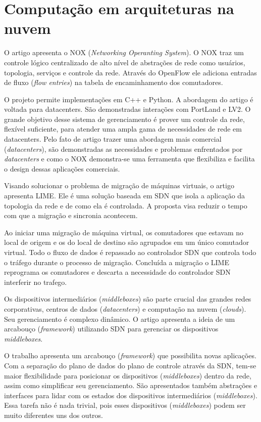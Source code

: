 \section{Computação em arquiteturas na nuvem}

O artigo \citep{arsalan2009applying} apresenta o NOX
(\emph{Networking Operanting System}).
O NOX traz um controle lógico centralizado de alto nível de abstrações de
rede como usuários, topologia, serviços e controle da rede.
Através do OpenFlow ele adiciona entradas de fluxo (\emph{flow entries}) na
tabela de encaminhamento dos comutadores.

O projeto permite implementações em C++ e Python.
A abordagem do artigo é voltada para datacenters.
São demonstradas interações com PortLand e LV2.
O grande objetivo desse sistema de gerenciamento é prover um controle da rede,
flexível suficiente, para atender uma ampla gama de necessidades de rede em
datacenters.
Pelo fato de artigo trazer uma abordagem mais comercial (\emph{datacenters}),
são demonstradas as necessidades e problemas enfrentados por
\emph{datacenters} e como o NOX demonstra-se uma ferramenta que flexibiliza
e facilita o design dessas aplicações comerciais.

Visando solucionar o problema de migração de máquinas virtuais,
o artigo \citep{erik2012live} apresenta LIME.
Ele é uma solução baseada em SDN que isola a aplicação da topologia da rede e
de como ela é controlada.
A proposta visa reduzir o tempo com que a migração e sincronia acontecem.

Ao iniciar uma migração de máquina virtual, os comutadores que estavam no local
de origem e os do local de destino são agrupados em um único comutador virtual.
Todo o fluxo de dados é repassado ao controlador SDN que controla todo o
tráfego durante o processo de migração.
Concluída a migração o LIME reprograma os comutadores e descarta a necessidade
do controlador SDN interferir no trafego.

Os dispositivos intermediários (\emph{middleboxes}) são parte crucial das
grandes redes corporativas, centros de dados
(\emph{datacenters}) e computação na nuvem (\emph{clouds}).
Seu gerenciamento é complexo dinâmico.
O artigo \citep{aaron2012toward} apresenta a ideia de um arcabouço
(\emph{framework}) utilizando SDN para gerenciar os dispositivos
\emph{middleboxes}.

O trabalho apresenta um arcabouço (\emph{framework}) que possibilita
novas aplicações.
Com a separação do plano de dados do plano de controle através da SDN,
tem-se maior flexibilidade para posicionar os dispositivos (\emph{middleboxes})
dentro da rede, assim como simplificar seu gerenciamento.
São apresentados também abstrações e interfaces para lidar
com os estados dos dispositivos intermediários (\emph{middleboxes}).
Essa tarefa não é nada trivial, pois esses dispositivos (\emph{middleboxes})
podem ser muito diferentes uns dos outros.

